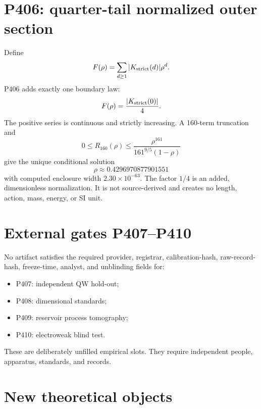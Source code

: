 \documentclass[11pt,a4paper,openany]{report}
\begin{document}
\chapter{P406: quarter-tail normalized outer section}

Define
\[
F(\rho)=\sum_{d\ge1}|K_{\rm strict}(d)|\rho^d.
\]
P406 adds exactly one boundary law:
\[
F(\rho)=\frac{|K_{\rm strict}(0)|}{4}.
\]
The positive series is continuous and strictly increasing. A 160-term
truncation and
\[
0\le R_{160}(\rho)\le
\frac{\rho^{161}}{161^{9/5}(1-\rho)}
\]
give the unique conditional solution
\[
\rho\approx0.4296970877901551
\]
with computed enclosure width $2.30\times10^{-63}$. The factor $1/4$ is an
added, dimensionless normalization. It is not source-derived and creates no
length, action, mass, energy, or SI unit.

\chapter{External gates P407--P410}

No artifact satisfies the required provider, registrar, calibration-hash,
raw-record-hash, freeze-time, analyst, and unblinding fields for:
\begin{itemize}
\item P407: independent QW hold-out;
\item P408: dimensional standards;
\item P409: reservoir process tomography;
\item P410: electroweak blind test.
\end{itemize}
These are deliberately unfilled empirical slots. They require independent
people, apparatus, standards, and records.

\chapter{New theoretical objects}
\end{document}
